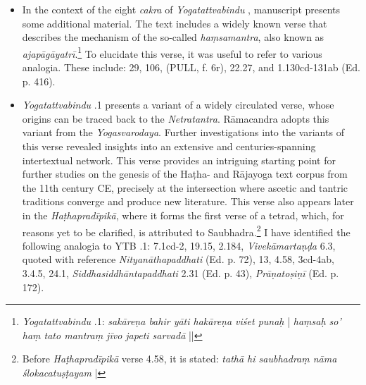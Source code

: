 \begin{itemize}

\item In the context of the eight \emph{cakra} of \emph{Yogatattvabindu} , manuscript  presents some additional material. The text includes a widely known verse that describes the mechanism of the so-called \textit{haṃsamantra}, also known as \textit{ajapāgāyatrī}.\footnote{\emph{Yogatattvabindu} .1: \textit{sakāreṇa bahir yāti hakāreṇa viśet punaḥ} | \textit{haṃsaḥ so' haṃ tato mantraṃ jīvo japeti sarvadā} ||} To elucidate this verse, it was useful to refer to various analogia. These include: \approx {} 29, \approx {} 106, \approx {} (PULL, f. 6r), \approx {} 22.27, and \approx {} 1.130cd-131ab (Ed. p. 416).
  
\item \emph{Yogatattvabindu} .1 presents a variant of a widely circulated verse, whose origins can be traced back to the \emph{Netratantra}. Rāmacandra adopts this variant from the \emph{Yogasvarodaya}. Further investigations into the variants of this verse revealed insights into an extensive and centuries-spanning intertextual network. This verse provides an intriguing starting point for further studies on the genesis of the Haṭha- and Rājayoga text corpus from the 11th century CE, precisely at the intersection where ascetic and tantric traditions converge and produce new literature. This verse also appears later in the \emph{Haṭhapradīpikā}, where it forms the first verse of a tetrad, which, for reasons yet to be clarified, is attributed to Saubhadra.\footnote{Before \emph{Haṭhapradīpikā} verse 4.58, it is stated: \emph{tathā hi saubhadraṃ nāma ślokacatuṣṭayam} |} I have identified the following analogia to YTB .1: \approx {} 7.1cd-2, \approx {} 19.15, \approx {} 2.184, \approx \emph{Vivekāmartaṇḍa} 6.3, \approx {} quoted with reference \emph{Nityanāthapaddhati} (Ed. p. 72), \approx {} 13, \approx {} 4.58, \approx {} 3cd-4ab, \approx {} 3.4.5, \approx {} 24.1, \approx \emph{Siddhasiddhāntapaddhati} 2.31 (Ed. p. 43), \approx \emph{Prāṇatoṣiṇī} (Ed. p. 172).


\end{itemize}

